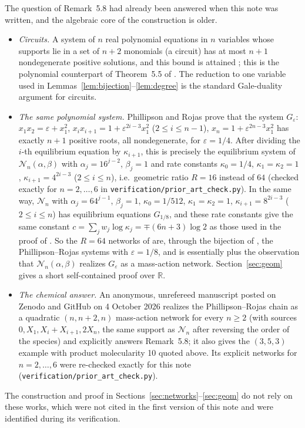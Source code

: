 \documentclass[11pt,a4paper]{report}
\newcommand{\Net}{\mathcal N}
\begin{document}
The question of Remark~5.8 had already been answered when this note was written, and the algebraic core of the
construction is older.
\begin{itemize}
\item \emph{Circuits.} A system of \(n\) real polynomial equations in \(n\) variables whose supports lie in a set of
\(n+2\) monomials (a circuit) has at most \(n+1\) nondegenerate positive solutions, and this bound is attained
\autocite{Bihan2007}; this is the polynomial counterpart of Theorem~5.5 of \autocite{BanajiFeliu2026}. The reduction
to one variable used in Lemmas~\ref{lem:bijection}--\ref{lem:degree} is the standard Gale-duality argument for circuits.
\item \emph{The same polynomial system.} Phillipson and Rojas \autocite[Theorem~1.6]{PhillipsonRojas2013} prove that
the system \(G_\varepsilon\): \(x_1x_2=\varepsilon+x_1^2\), \(x_ix_{i+1}=1+\varepsilon^{2i-3}x_1^2\) (\(2\le i\le n-1\)), \(x_n=1+\varepsilon^{2n-3}x_1^2\) has
exactly \(n+1\) positive roots, all nondegenerate, for \(\varepsilon=1/4\). After dividing the \(i\)-th equilibrium equation by
\(\kappa_{i+1}\), this is precisely the equilibrium system of \(\Net_n(\alpha,\beta)\) with \(\alpha_j=16^{j-2}\), \(\beta_j=1\)
and rate constants \(\kappa_0=1/4\), \(\kappa_1=\kappa_2=1\), \(\kappa_{i+1}=4^{2i-3}\) (\(2\le i\le n\)), i.e.\ geometric ratio
\(R=16\) instead of \(64\) (checked exactly for \(n=2,\dots,6\) in \texttt{verification/prior\_art\_check.py}). In the
same way, \(\Net_n\) with \(\alpha_j=64^{j-1}\), \(\beta_j=1\), \(\kappa_0=1/512\), \(\kappa_1=\kappa_2=1\), \(\kappa_{i+1}=8^{2i-3}\)
(\(2\le i\le n\)) has equilibrium equations \(G_{1/8}\), and these rate constants give the same constant
\(c=\sum_jw_j\log\kappa_j=\mp(6n+3)\log2\) as those used in the proof of . So the \(R=64\) networks of
 are, through the bijection of , the Phillipson--Rojas systems with \(\varepsilon=1/8\),
and  is essentially \autocite[Theorem~1.6]{PhillipsonRojas2013} plus the observation that
\(\Net_n(\alpha,\beta)\) realizes \(G_\varepsilon\) as a mass-action network. Section~\ref{sec:geom} gives a short
self-contained proof over \(\mathbb R\).
\item \emph{The chemical answer.} An anonymous, unrefereed manuscript posted on Zenodo and GitHub on 4 October 2026
\autocite{Anon2026} realizes the Phillipson--Rojas chain as a quadratic \((n,n+2,n)\) mass-action network for every
\(n\ge2\) (with sources \(0,X_1,X_i+X_{i+1},2X_n\), the same support as \(\Net_n\) after reversing the order of the species)
and explicitly answers Remark~5.8; it also gives the \((3,5,3)\) example with product molecularity 10 quoted above. Its
explicit networks for \(n=2,\dots,6\) were re-checked exactly for this note (\texttt{verification/prior\_art\_check.py}).
\end{itemize}
The construction and proof in Sections~\ref{sec:networks}--\ref{sec:geom} do not rely on these works, which were not
cited in the first version of this note and were identified during its verification.
\end{document}
